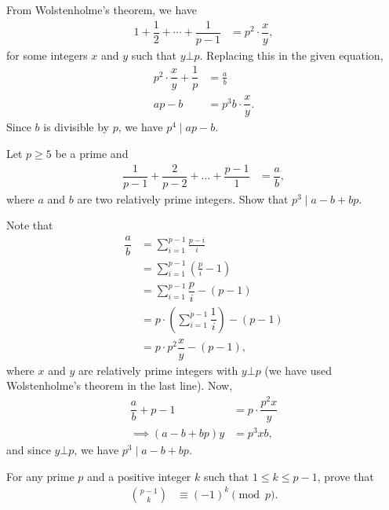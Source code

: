 \documentclass[12pt]{subfile}
\begin{document}
		\begin{solution}
			From Wolstenholme's theorem, we have
				\begin{align*}
					1 + \dfrac{1}{2} + \cdots + \dfrac{1}{p-1}
						& = p^2 \cdot \dfrac{x}{y},
				\end{align*}
			for some integers $x$ and $y$ such that $y \bot p$. Replacing this in the given equation,
				\begin{align*}
					p^2 \cdot \dfrac{x}{y}+ \dfrac{1}{p}
						& = \frac{a}{b}\\
					ap-b
						& = p^3b \cdot \dfrac{x}{y}.
				\end{align*}
			Since $b$ is divisible by $p$, we have $p^4\mid ap-b$.
		\end{solution}

		\begin{problem}
			Let $p \geq 5$ be a prime and
				\begin{align*}
					\dfrac{1}{p-1} + \dfrac{2}{p-2} + \ldots + \dfrac{p-1}{1}
						& =\dfrac{a}{b},
				\end{align*}
			where $a$ and $b$ are two relatively prime integers. Show that $p^3\mid a-b+bp$.
		\end{problem}

		\begin{solution}
			Note that
				\begin{align*}
					\dfrac{a}{b}
						& = \sum_{i=1}^{p-1} \frac{p-i}{i}\\
						& =\sum_{i=1}^{p-1} \left(\frac{p}{i} -1 \right)\\
						& =\sum_{i=1}^{p-1} \dfrac{p}{i} - (p-1)\\
						& = p\cdot\left(\sum_{i=1}^{p-1} \dfrac{1}{i}\right)-(p-1)\\
						& = p \cdot p^2 \dfrac{x}{y}-(p-1),
				\end{align*}
			where $x$ and $y$ are relatively prime integers with $y \bot p$ (we have used Wolstenholme's theorem in the last line). Now,
				\begin{align*}
					\dfrac a b+p-1
						& =p\cdot\dfrac{p^2x}y\\
					\implies (a-b+bp)y
						& =p^3xb,
				\end{align*}
			and since $y\bot p$, we have $p^3\mid a-b+bp$.
		\end{solution}



		\begin{problem}\label{prob:binom(p-1)(k)}
			For any prime $p$ and a positive integer $k$ such that $1 \leq k \leq p-1$, prove that
				\begin{align*}
					\binom{p-1}{k} & \equiv(-1)^k\pmod p.
				\end{align*}
		\end{problem}
\end{document}
